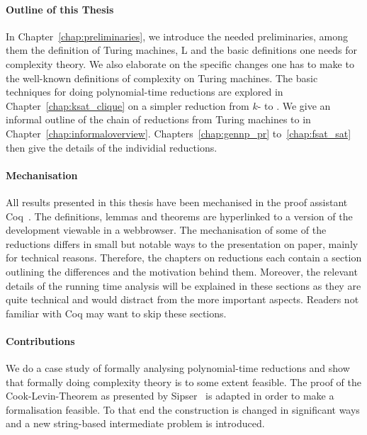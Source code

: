 \paragraph{Outline of this Thesis}
In Chapter~\ref{chap:preliminaries}, we introduce the needed preliminaries, among them the definition of Turing machines, L and the basic definitions one needs for complexity theory. We also elaborate on the specific changes one has to make to the well-known definitions of complexity on Turing machines.
The basic techniques for doing polynomial-time reductions are explored in Chapter~\ref{chap:ksat_clique} on a simpler reduction from $k$-\SAT{} to \Clique{}.
We give an informal outline of the chain of reductions from Turing machines to \SAT{} in Chapter~\ref{chap:informaloverview}. 
Chapters~\ref{chap:gennp_pr} to~\ref{chap:fsat_sat} then give the details of the individial reductions.

\paragraph{Mechanisation}
All results presented in this thesis have been mechanised in the proof assistant Coq~\cite{coqweb}. The definitions, lemmas and theorems are hyperlinked to a version of the development viewable in a webbrowser.
The mechanisation of some of the reductions differs in small but notable ways to the presentation on paper, mainly for technical reasons. 
Therefore, the chapters on reductions each contain a section outlining the differences and the motivation behind them. 
Moreover, the relevant details of the running time analysis will be explained in these sections as they are quite technical and would distract from the more important aspects.
Readers not familiar with Coq may want to skip these sections.

\paragraph{Contributions}
We do a case study of formally analysing polynomial-time reductions and show that formally doing complexity theory is to some extent feasible.
The proof of the Cook-Levin-Theorem as presented by Sipser~\cite{Sipser:TheoryofComputation} is adapted in order to make a formalisation feasible. To that end the construction is changed in significant ways and a new string-based intermediate problem is introduced. 




